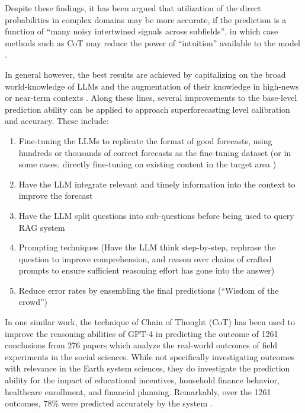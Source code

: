 \documentclass[12pt,a4paper]{article}
\begin{document}
Despite these findings, it has been argued that utilization of the direct probabilities in complex domains may be more accurate, if the prediction is a function of ``many noisy intertwined signals across subfields'', in which case methods such as CoT may reduce the power of ``intuition'' available to the model .

In general however, the best results are achieved by capitalizing on the broad world-knowledge of LLMs and the augmentation of their knowledge in high-news or near-term contexts . Along these lines, several improvements to the base-level prediction ability can be applied to approach superforecasting level calibration and accuracy. These include: 
\begin{enumerate}
\item Fine-tuning the LLMs to replicate the format of good forecasts, using hundreds or thousands of correct forecasts as the fine-tuning dataset (or in some cases, directly fine-tuning on existing content in the target area )
\item Have the LLM integrate relevant and timely information into the context to improve the forecast
\item Have the LLM split questions into sub-questions before being used to query RAG system
\item Prompting techniques (Have the LLM think step-by-step, rephrase the question to improve comprehension, and reason over chains of crafted prompts to ensure sufficient reasoning effort has gone into the answer)
\item Reduce error rates by ensembling the final predictions (``Wisdom of the crowd'')
\end{enumerate}


In one similar work, the technique of Chain of Thought (CoT) has been used to improve the reasoning abilities of GPT-4 in predicting the outcome of 1261 conclusions from 276 papers which analyze the real-world outcomes of field experiments in the social sciences. While not specifically investigating outcomes with relevance in the Earth system sciences, they do investigate the prediction ability for the impact of educational incentives, household finance behavior, healthcare enrollment, and financial planning. Remarkably, over the 1261 outcomes, 78\% were predicted accurately by the system .
\end{document}

